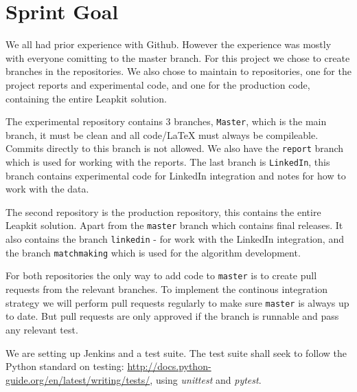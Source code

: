 \section{Sprint Goal}

We all had prior experience with Github. However the experience was
mostly with everyone comitting to the master branch. For this project we
chose to create branches in the repositories. We also chose to maintain to
repositories, one for the project reports and experimental code, and one
for the production code, containing the entire Leapkit solution.

The experimental repository contains 3 branches, \texttt{Master}, which
is the main branch, it must be clean and all code/LaTeX must always be
compileable. Commits directly to this branch is not allowed. We also have
the \texttt{report} branch which is used for working with the reports. The
last branch is \texttt{LinkedIn}, this branch contains experimental code
for LinkedIn integration and notes for how to work with the data.

The second repository is the production repository, this contains
the entire Leapkit solution. Apart from the \texttt{master}
branch which contains final releases. It also contains the branch
\texttt{linkedin} - for work with the LinkedIn integration, and the branch
\texttt{matchmaking} which is used for the algorithm development.

For both repositories the only way to add code to \texttt{master} is
to create pull requests from the relevant branches. To implement the
continous integration strategy we will perform pull requests regularly
to make sure \texttt{master} is always up to date. But pull requests are
only approved if the branch is runnable and pass any relevant test. 

We are setting up Jenkins and a test suite. The test suite shall seek to follow the Python standard on testing: \url{http://docs.python-guide.org/en/latest/writing/tests/}, using \textit{unittest} and \textit{pytest}.